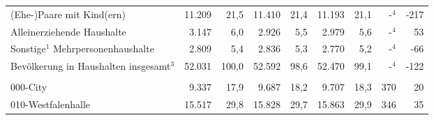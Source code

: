 \documentclass[
  a4paper,
  twoside]{article}
\begin{document}
\begin{table}[H]
{\begin{threeparttable}
\begin{tabular}[t]{>{}l>{}r>{}r>{}r>{}r>{}r>{}r>{}r>{}r}
\hspace{1em}\hspace{1em}\textcolor{DoGray}{(Ehe-)Paare mit Kind(ern)} & \textcolor{DoGray}{11.209} & \textcolor{DoGray}{21,5} & \textcolor{DoGray}{11.410} & \textcolor{DoGray}{21,4} & \textcolor{DoGray}{11.193} & \textcolor{DoGray}{21,1} & \textcolor{DoGray}{-$^{4}$} & \textcolor{DoGray}{-217}\\
\hspace{1em}\hspace{1em}\textcolor{DoGray}{Alleinerziehende Haushalte} & \textcolor{DoGray}{3.147} & \textcolor{DoGray}{6,0} & \textcolor{DoGray}{2.926} & \textcolor{DoGray}{5,5} & \textcolor{DoGray}{2.979} & \textcolor{DoGray}{5,6} & \textcolor{DoGray}{-$^{4}$} & \textcolor{DoGray}{53}\\
\hspace{1em}\hspace{1em}\textcolor{DoGray}{Sonstige$^{1}$ Mehrpersonenhaushalte} & \textcolor{DoGray}{2.809} & \textcolor{DoGray}{5,4} & \textcolor{DoGray}{2.836} & \textcolor{DoGray}{5,3} & \textcolor{DoGray}{2.770} & \textcolor{DoGray}{5,2} & \textcolor{DoGray}{-$^{4}$} & \textcolor{DoGray}{-66}\\
\hspace{1em}\hspace{1em}\textcolor{DoGray}{Bevölkerung in Haushalten insgesamt$^{3}$} & \textcolor{DoGray}{52.031} & \textcolor{DoGray}{100,0} & \textcolor{DoGray}{52.592} & \textcolor{DoGray}{98,6} & \textcolor{DoGray}{52.470} & \textcolor{DoGray}{99,1} & \textcolor{DoGray}{-$^{4}$} & \textcolor{DoGray}{-122}\\
\addlinespace[0.3em]
\multicolumn{9}{l}{\textcolor[HTML]{044891}{Bevölkerung nach Statistischen Bezirken}}\\
\hspace{1em}\hspace{1em}\textcolor{DoGray}{000-City} & \textcolor{DoGray}{9.337} & \textcolor{DoGray}{17,9} & \textcolor{DoGray}{9.687} & \textcolor{DoGray}{18,2} & \textcolor{DoGray}{9.707} & \textcolor{DoGray}{18,3} & \textcolor{DoGray}{370} & \textcolor{DoGray}{20}\\
\hspace{1em}\hspace{1em}\textcolor{DoGray}{010-Westfalenhalle} & \textcolor{DoGray}{15.517} & \textcolor{DoGray}{29,8} & \textcolor{DoGray}{15.828} & \textcolor{DoGray}{29,7} & \textcolor{DoGray}{15.863} & \textcolor{DoGray}{29,9} & \textcolor{DoGray}{346} & \textcolor{DoGray}{35}\\

\end{tabular}
\end{threeparttable}}
\end{table}
\end{document}
